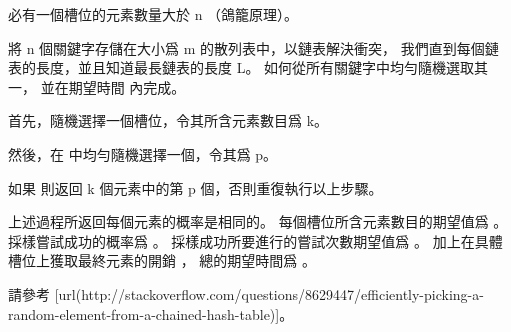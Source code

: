 \startANSWER
必有一個槽位的元素數量大於 n （鴿籠原理）。
\stopANSWER

\startEXERCISE
將 n 個關鍵字存儲在大小爲 m 的散列表中，以鏈表解決衝突，
我們直到每個鏈表的長度，並且知道最長鏈表的長度 L。
如何從所有關鍵字中均勻隨機選取其一，
並在期望時間  內完成。
\stopEXERCISE

\startANSWER
首先，隨機選擇一個槽位，令其所含元素數目爲 k。

然後，在  中均勻隨機選擇一個，令其爲 p。

如果  則返回 k 個元素中的第 p 個，否則重復執行以上步驟。

上述過程所返回每個元素的概率是相同的。
每個槽位所含元素數目的期望值爲 。
採樣嘗試成功的概率爲 。
採樣成功所要進行的嘗試次數期望值爲 。
加上在具體槽位上獲取最終元素的開銷 ，
總的期望時間爲 。

請參考 [url(http://stackoverflow.com/questions/8629447/efficiently-picking-a-random-element-from-a-chained-hash-table)]。
\stopANSWER

\stopsection
